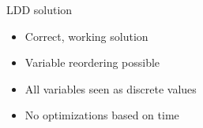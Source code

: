 \begin{frame}{LDD solution}
\begin{itemize}
	\item Correct, working solution
	\item Variable reordering possible
	\item All variables seen as discrete values
	\item No optimizations based on time
\end{itemize}
\end{frame}

